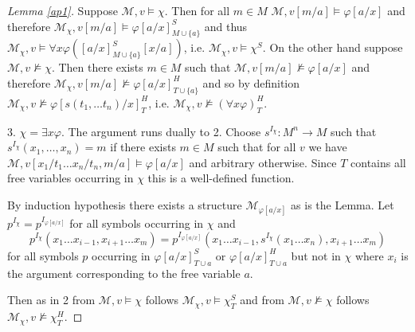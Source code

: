 \documentclass[a4paper,UKenglish,cleveref, autoref, thm-restate]{lipics-v2021}
\begin{document}
\begin{proof}[Lemma \ref{ap1}]
	Suppose $\mathcal M, v\models\chi$. Then for all $m\in M$ $\mathcal M, v[m/a]\models\varphi[a/x]$ and therefore $\mathcal M_{\chi}, v[m/a]\models\varphi[a/x]^S_{M\cup\{a\}}$ and thus $\mathcal M_{\chi}, v\models \forall x\varphi([a/x]^S_{M\cup\{a\}}[x/a])$, i.e. $\mathcal M_\chi,v\models \chi^S$. On the other hand suppose $\mathcal M, v\not\models\chi$. Then there exists $m\in M$ such that $\mathcal M, v[m/a]\not\models\varphi[a/x]$ and therefore $\mathcal M_\chi, v[m/a]\not\models\varphi[a/x]^H_{T\cup\{a\}}$ and so by definition $\mathcal M_\chi, v\not\models\varphi[s(t_1,\dots t_n)/x]^H_T$, i.e. $\mathcal M_\chi, v\not\models(\forall x\varphi)^H_T$.
	
	3. $\chi = \exists x\varphi$. The argument runs dually to 2. Choose $s^{I_\chi}:M^n\to M$ such that $s^{I_\chi}(x_1,\dots, x_n) = m$ if there exists $m\in M$ such that for all $v$ we have $\mathcal M, v[x_1/t_1\dots x_n/t_n, m/a]\models\varphi[a/x]$ and arbitrary otherwise. Since $T$ contains all free variables occurring in $\chi$ this is a well-defined function.
	
	By induction hypothesis there exists a structure $\mathcal M_{\varphi[a/x]}$ as is the Lemma. Let $p^{I_\chi} = p^{I_{\varphi[a/x]}}$ for all symbols occurring in $\chi$ and $$p^{I_\chi}(x_1\dots x_{i-1}, x_{i+1}\dots x_m) = p^{I_{\varphi[a/x]}}(x_1\dots x_{i-1}, s^{I_\chi}(x_1\dots x_n), x_{i+1}\dots x_m)$$ for all symbols $p$ occurring in $\varphi[a/x]^S_{T\cup a}$ or $\varphi[a/x]^H_{T\cup a}$ but not in $\chi$ where $x_i$ is the argument corresponding to the free variable $a$.
	
	Then as in 2 from $\mathcal M, v\models \chi$ follows $\mathcal M_\chi,v\models\chi^S_T$ and from $\mathcal M, v\not\models \chi$ follows $\mathcal M_\chi,v\not\models\chi^H_T$.
\end{proof}
\end{document}

